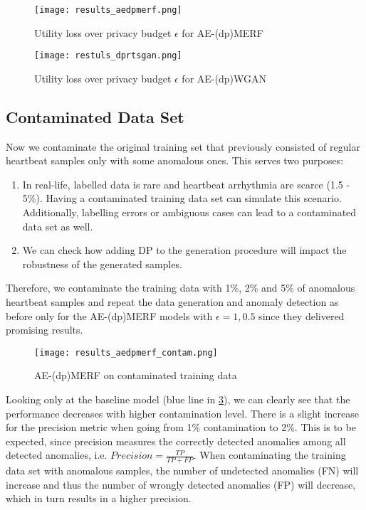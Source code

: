 \begin{figure}[H]
    \centering
    \texttt{[image: results\_aedpmerf.png]}
    \caption{Utility loss over privacy budget $\epsilon$ for AE-(dp)MERF}
    \label{fig:res_aedpmerf}
\end{figure}

\begin{figure}[H]
    \centering
    \texttt{[image: restuls\_dprtsgan.png]}
    \caption{Utility loss over privacy budget $\epsilon$ for AE-(dp)WGAN}
    \label{fig:res_aedpmerf}
\end{figure}

\subsection{Contaminated Data Set}
Now we contaminate the original training set that previously consisted of regular heartbeat samples only with some anomalous ones. This serves two purposes:
\begin{enumerate}
    \item In real-life, labelled data is rare and heartbeat arrhythmia are scarce (1.5 - 5\%). Having a contaminated training data set can simulate this scenario. Additionally, labelling errors or ambiguous cases can lead to a contaminated data set as well.
    \item We can check how adding DP to the generation procedure will impact the robustness of the generated samples. 
\end{enumerate}

Therefore, we contaminate the training data with 1\%, 2\% and 5\% of anomalous heartbeat samples and repeat the data generation and anomaly detection as before only for the AE-(dp)MERF models with $\epsilon=1, 0.5$ since they delivered promising results.

\begin{figure}[H]
    \centering
    \texttt{[image: results\_aedpmerf\_contam.png]}
    \caption{AE-(dp)MERF on contaminated training data}
    \label{fig:res_contam_aedpmerf}
\end{figure}

Looking only at the baseline model (blue line in \cref{fig:res_contam_aedpmerf}), we can clearly see that the performance decreases with higher contamination level. There is a slight increase for the precision metric when going from 1\% contamination to 2\%. This is to be expected, since precision measures the correctly detected anomalies among all detected anomalies, i.e. $Precision=\frac{TP}{TP+FP}$. When contaminating the training data set with anomalous samples, the number of undetected anomalies (FN) will increase and thus the number of wrongly detected anomalies (FP) will decrease, which in turn results in a higher precision.

